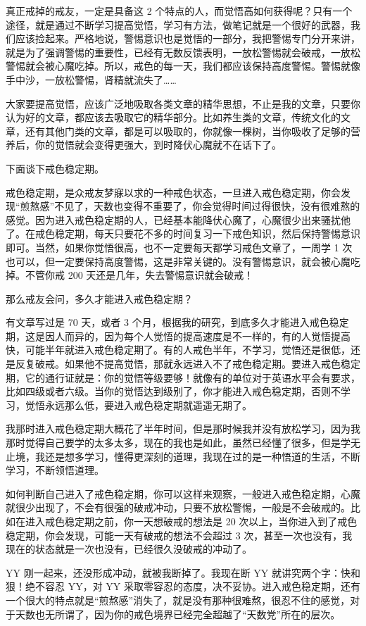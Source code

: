 \documentclass{ctexart}
\begin{document}
真正戒掉的戒友，一定是具备这 2 个特点的人，而觉悟高如何获得呢？只有一个途径，就是通过不断学习提高觉悟，学习有方法，做笔记就是一个很好的武器，我们应该捡起来。严格地说，警惕意识也是觉悟的一部分，我把警惕专门分开来讲，就是为了强调警惕的重要性，已经有无数反馈表明，一放松警惕就会破戒，一放松警惕就会被心魔吃掉。所以，戒色的每一天，我们都应该保持高度警惕。警惕就像手中沙，一放松警惕，肾精就流失了……

大家要提高觉悟，应该广泛地吸取各类文章的精华思想，不止是我的文章，只要你认为好的文章，都应该去吸取它的精华部分。比如养生类的文章，传统文化的文章，还有其他门类的文章，都是可以吸取的，你就像一棵树，当你吸收了足够的营养后，你的觉悟就会变得更强大，到时降伏心魔就不在话下了。

下面谈下戒色稳定期。

戒色稳定期，是众戒友梦寐以求的一种戒色状态，一旦进入戒色稳定期，你会发现“煎熬感”不见了，天数也变得不重要了，你会觉得时间过得很快，没有很难熬的感觉。因为进入戒色稳定期的人，已经基本能降伏心魔了，心魔很少出来骚扰他了。在戒色稳定期，每天只要花不多的时间复习一下戒色知识，然后保持警惕意识即可。当然，如果你觉悟很高，也不一定要每天都学习戒色文章了，一周学 1 次也可以，但一定要保持高度警惕，这是非常关键的。没有警惕意识，就会被心魔吃掉。不管你戒 200 天还是几年，失去警惕意识就会破戒！

那么戒友会问，多久才能进入戒色稳定期？

有文章写过是 70 天，或者 3 个月，根据我的研究，到底多久才能进入戒色稳定期，这是因人而异的，因为每个人觉悟的提高速度是不一样的，有的人觉悟提高快，可能半年就进入戒色稳定期了。有的人戒色半年，不学习，觉悟还是很低，还是反复破戒。如果他不提高觉悟，那就永远进入不了戒色稳定期。要进入戒色稳定期，它的通行证就是：你的觉悟等级要够！就像有的单位对于英语水平会有要求，比如四级或者六级。当你的觉悟达到级别了，你才能进入戒色稳定期，否则不学习，觉悟永远那么低，要进入戒色稳定期就遥遥无期了。

我那时进入戒色稳定期大概花了半年时间，但是那时候我并没有放松学习，因为我那时觉得自己要学的太多太多，现在的我也是如此，虽然已经懂了很多，但是学无止境，我还是想多学习，懂得更深刻的道理，我现在过的是一种悟道的生活，不断学习，不断领悟道理。

如何判断自己进入了戒色稳定期，你可以这样来观察，一般进入戒色稳定期，心魔就很少出现了，不会有很强的破戒冲动，只要不放松警惕，一般是不会破戒的。比如在进入戒色稳定期之前，你一天想破戒的想法是 20 次以上，当你进入到了戒色稳定期，你会发现，可能一天有破戒的想法不会超过 3 次，甚至一次也没有，我现在的状态就是一次也没有，已经很久没破戒的冲动了。

YY 刚一起来，还没形成冲动，就被我断掉了。我现在断 YY 就讲究两个字：快和狠！绝不容忍 YY，对 YY 采取零容忍的态度，决不妥协。进入戒色稳定期，还有一个很大的特点就是“煎熬感”消失了，就是没有那种很难熬，很忍不住的感觉，对于天数也无所谓了，因为你的戒色境界已经完全超越了“天数党”所在的层次。
\end{document}
